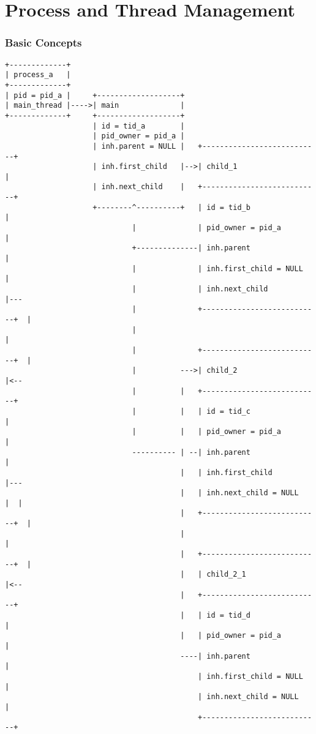 \part{Process and Thread Management}

\section{Basic Concepts}

\begin{verbatim}
+-------------+
| process_a   |
+-------------+
| pid = pid_a |     +-------------------+
| main_thread |---->| main              |
+-------------+     +-------------------+
                    | id = tid_a        |
                    | pid_owner = pid_a |
                    | inh.parent = NULL |   +---------------------------+
                    | inh.first_child   |-->| child_1                   |
                    | inh.next_child    |   +---------------------------+
                    +--------^----------+   | id = tid_b                |
                             |              | pid_owner = pid_a         |
                             +--------------| inh.parent                |
                             |              | inh.first_child = NULL    |
                             |              | inh.next_child            |---
                             |              +---------------------------+  |
                             |                                             |
                             |              +---------------------------+  |
                             |          --->| child_2                   |<--
                             |          |   +---------------------------+
                             |          |   | id = tid_c                |
                             |          |   | pid_owner = pid_a         |
                             ---------- | --| inh.parent                |
                                        |   | inh.first_child           |---
                                        |   | inh.next_child = NULL     |  |
                                        |   +---------------------------+  |
                                        |                                  |
                                        |   +---------------------------+  |
                                        |   | child_2_1                 |<--
                                        |   +---------------------------+
                                        |   | id = tid_d                |
                                        |   | pid_owner = pid_a         |
                                        ----| inh.parent                |
                                            | inh.first_child = NULL    |
                                            | inh.next_child = NULL     |
                                            +---------------------------+
\end{verbatim}

